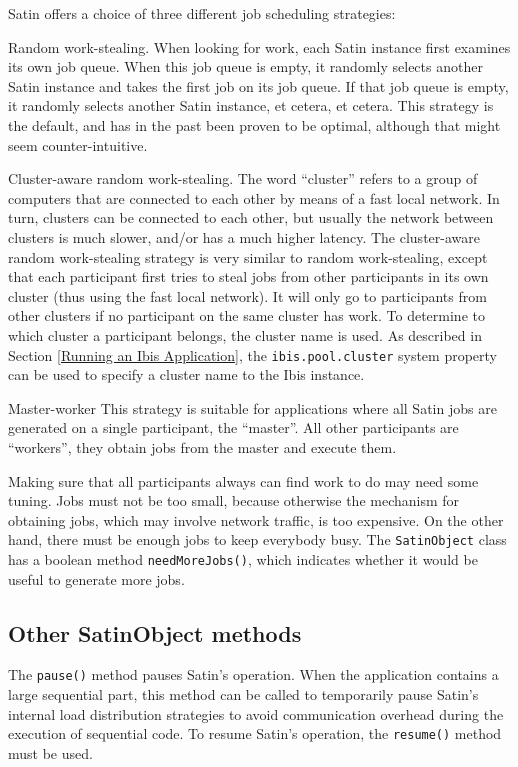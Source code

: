 \documentclass[10pt]{article}
\newcommand{\mysubsection}[1]{\subsection{#1}\label{#1}}
\begin{document}
Satin offers a choice of three different job scheduling strategies:
\begin{description}
\item{Random work-stealing}.
When looking for work, each Satin instance
first examines its own job queue. When this job queue is empty,
it randomly selects another Satin instance and takes the first job on its job queue.
If that job queue is empty, it randomly selects another Satin instance, et cetera,
et cetera.  This strategy is the default, and has in the past been proven
to be optimal, although that might seem counter-intuitive.

\item{Cluster-aware random work-stealing}.
The word ``cluster'' refers to a group of computers that are connected
to each other by means of a fast local network.
In turn, clusters can be connected to each other, but usually the
network between clusters is much slower, and/or has a much higher latency.
The cluster-aware random work-stealing strategy
is very similar to random work-stealing, except that
each participant first tries to steal jobs from other participants in its
own cluster (thus using the fast local network).
It will only go to participants from other clusters if no participant on the
same cluster has work.
To determine to which cluster a participant belongs, the cluster name
is used.
As described in Section \ref{Running an Ibis Application},
the \texttt{ibis.pool.cluster} system property can be used to
specify a cluster name to the Ibis instance.

\item{Master-worker}
This strategy is suitable for applications where all Satin jobs are
generated on a single participant, the ``master''. All other participants
are ``workers'', they obtain jobs from the master and execute them.
\end{description}

Making sure that all participants always can find work to do may need
some tuning. Jobs must not be too small, because otherwise the mechanism
for obtaining jobs, which may involve network traffic, is too expensive.
On the other hand, there must be enough jobs to keep everybody busy.
The \texttt{SatinObject} class has a boolean method \texttt{needMoreJobs()},
which indicates whether it would be useful to generate more jobs.

\mysubsection{Other SatinObject methods}

The \texttt{pause()} method pauses Satin's operation. When the application
contains a large sequential part, this method can be called to temporarily
pause Satin's internal load distribution strategies to avoid communication
overhead during the execution of sequential code.
To resume Satin's operation, the \texttt{resume()} method must be used.
\end{document}
